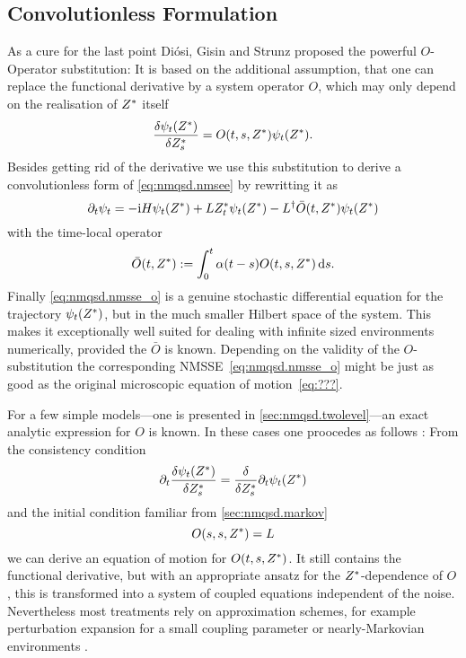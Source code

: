 \subsection{Convolutionless Formulation}
\label{sub:nmqsd.lin_nmsse.convolutionless}

As a cure for the last point Diósi, Gisin and Strunz \cite{DiGiSt98_nmqsd} proposed the powerful $O$-Operator substitution:
It is based on the additional assumption, that one can replace the functional derivative by a system operator $O$, which may only depend on the realisation of ${Z}^*$ itself
\begin{equation}
  \frac{\delta \psi_t({Z}^*)}{\delta {Z}^*_s} = O(t, s, {Z}^*) \psi_t({Z}^*).
  \label{eq:nmqsd.o_substition}
\end{equation}
Besides getting rid of the derivative we use this substitution to derive a convolutionless form of \autoref{eq:nmqsd.nmsee} by rewritting it as
\begin{equation}
  \partial_t \psi_t = -\mathrm{i}H\psi_t({Z}^*)  +  L{Z}^*_t\psi_t({Z}^*)  -  L^\dagger \bar O(t, {Z}^*) \psi_t({Z}^*)
  \label{eq:nmqsd.nmsse_o}
\end{equation}
with the time-local operator
\begin{equation}
  \bar O(t, {Z}^*) := \int_0^t \alpha(t - s) O(t, s, {Z}^*) \, \mathrm{d} s.
  \label{eq:nmqsd.o_bar}
\end{equation}
Finally \autoref{eq:nmqsd.nmsse_o} is a genuine stochastic differential equation for the trajectory $\psi_t({Z}^*)$, but in the much smaller Hilbert space of the system.
This makes it exceptionally well suited for dealing with infinite sized environments numerically, provided the $\bar O$ is known.
Depending on the validity of the $O$-substitution the corresponding NMSSE~\ref{eq:nmqsd.nmsse_o} might be just as good as the original microscopic equation of motion~\ref{eq:???}.

For a few simple models---one is presented in \autoref{sec:nmqsd.twolevel}---an exact analytic expression for $O$ is known.
In these cases one proocedes as follows \cite{DiGiSt98_nmqsd}:
From the consistency condition
\begin{equation*}
  \partial_t \frac{\delta \psi_t({Z}^*)}{\delta {Z}^*_s} = \frac{\delta}{\delta {Z}^*_s} \partial_t \psi_t({Z}^*)
\end{equation*}
and the initial condition familiar from \autoref{sec:nmqsd.markov}
\begin{equation*}
  O(s, s, {Z}^*) = L
\end{equation*}
we can derive an equation of motion for $O(t, s, {Z}^*)$.
It still contains the functional derivative, but with an appropriate ansatz for the ${Z}^*$-dependence of $O$, this is transformed into a system of coupled equations independent of the noise.
Nevertheless most treatments rely on approximation schemes, for example perturbation expansion for a small coupling parameter or nearly-Markovian environments \cite{YuDiGiSt99_pertubation}.

